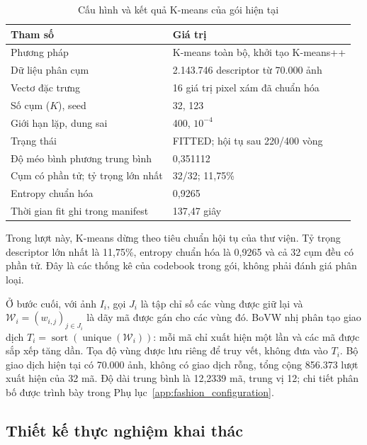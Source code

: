 \begin{table}[!t]
    \centering
    \caption{Cấu hình và kết quả K-means của gói hiện tại}
    \label{tab:kmeans_configuration}
    \footnotesize
    \setlength{\tabcolsep}{3pt}
    \begin{tabular}{@{}p{} p{}@{}}
        \hline
        \textbf{Tham số} & \textbf{Giá trị} \\
        \hline
        Phương pháp & K-means toàn bộ, khởi tạo K-means++ \\
        Dữ liệu phân cụm & 2.143.746 descriptor từ 70.000 ảnh \\
        Vectơ đặc trưng & 16 giá trị pixel xám đã chuẩn hóa \\
        Số cụm ($K$), seed & 32, 123 \\
        Giới hạn lặp, dung sai & 400, $10^{-4}$ \\
        Trạng thái & FITTED; hội tụ sau 220/400 vòng \\
        Độ méo bình phương trung bình & 0,351112 \\
        Cụm có phần tử; tỷ trọng lớn nhất & 32/32; 11,75\% \\
        Entropy chuẩn hóa & 0,9265 \\
        Thời gian fit ghi trong manifest & 137,47 giây \\
        \hline
    \end{tabular}
\end{table}

Trong lượt này, K-means dừng theo tiêu chuẩn hội tụ của thư viện. Tỷ trọng descriptor lớn nhất là 11,75\%, entropy chuẩn hóa là 0,9265 và cả 32 cụm đều có phần tử. Đây là các thống kê của codebook trong gói, không phải đánh giá phân loại.

Ở bước cuối, với ảnh $I_i$, gọi $J_i$ là tập chỉ số các vùng được giữ lại và $\mathcal{W}_i=(w_{i,j})_{j\in J_i}$ là dãy mã được gán cho các vùng đó. BoVW nhị phân tạo giao dịch $T_i=\operatorname{sort}(\operatorname{unique}(\mathcal{W}_i))$: mỗi mã chỉ xuất hiện một lần và các mã được sắp xếp tăng dần. Tọa độ vùng được lưu riêng để truy vết, không đưa vào $T_i$. Bộ giao dịch hiện tại có 70.000 ảnh, không có giao dịch rỗng, tổng cộng 856.373 lượt xuất hiện của 32 mã. Độ dài trung bình là 12,2339 mã, trung vị 12; chi tiết phân bố được trình bày trong Phụ lục~\ref{app:fashion_configuration}.

\subsection{Thiết kế thực nghiệm khai thác}

